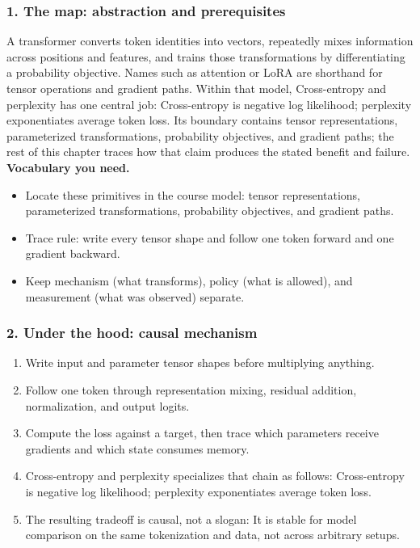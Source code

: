 \subsubsection*{1. The map: abstraction and prerequisites}
A transformer converts token identities into vectors, repeatedly mixes information across positions and features, and trains those transformations by differentiating a probability objective. Names such as attention or LoRA are shorthand for tensor operations and gradient paths.
Within that model, Cross-entropy and perplexity has one central job: Cross-entropy is negative log likelihood; perplexity exponentiates average token loss. Its boundary contains tensor representations, parameterized transformations, probability objectives, and gradient paths; the rest of this chapter traces how that claim produces the stated benefit and failure.
\textbf{Vocabulary you need.}\begin{itemize}
\item Locate these primitives in the course model: tensor representations, parameterized transformations, probability objectives, and gradient paths.
\item Trace rule: write every tensor shape and follow one token forward and one gradient backward.
\item Keep mechanism (what transforms), policy (what is allowed), and measurement (what was observed) separate.
\end{itemize}
\subsubsection*{2. Under the hood: causal mechanism}\begin{enumerate}
\item Write input and parameter tensor shapes before multiplying anything.
\item Follow one token through representation mixing, residual addition, normalization, and output logits.
\item Compute the loss against a target, then trace which parameters receive gradients and which state consumes memory.
\item Cross-entropy and perplexity specializes that chain as follows: Cross-entropy is negative log likelihood; perplexity exponentiates average token loss.
\item The resulting tradeoff is causal, not a slogan: It is stable for model comparison on the same tokenization and data, not across arbitrary setups.
\end{enumerate}

